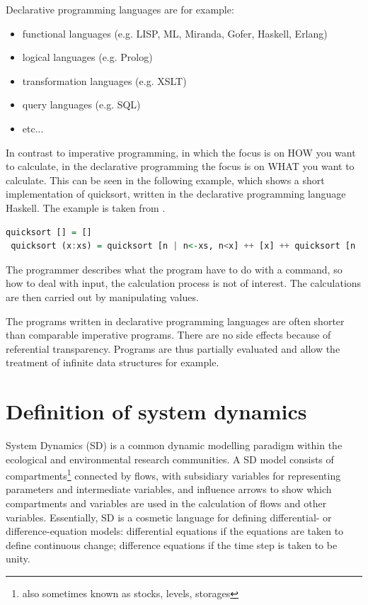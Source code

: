 \par
Declarative programming languages are for example:
\begin{itemize}
	\item functional languages (e.g. LISP, ML, Miranda, Gofer, Haskell, Erlang)
	\item logical languages (e.g. Prolog)
	\item transformation languages (e.g. XSLT)
	\item query languages (e.g. SQL)
	\item etc...
\end{itemize}

\par
In contrast to imperative programming, in which the focus is on HOW you want to calculate, in the declarative programming the focus is on WHAT you want to calculate. This can be seen in the following example, which shows a short implementation of quicksort, written in the declarative programming language Haskell. The example is taken from \autocite{appendix:declarative_programming}.
\begin{lstlisting}[language=Haskell]
 quicksort [] = []
 quicksort (x:xs) = quicksort [n | n<-xs, n<x] ++ [x] ++ quicksort [n | n<-xs, n>=x]
\end{lstlisting}
The programmer describes what the program have to do with a command, so how to deal with input, the calculation process is not of interest. The calculations are then carried out by manipulating values.
\par
The programs written in declarative programming languages are often shorter than comparable imperative programs. There are no side effects because of referential transparency. Programs are thus partially evaluated and allow the treatment of infinite data structures for example. \autocite{appendix:hawkins}

\section{Definition of system dynamics}
\par
System Dynamics (SD) is a common dynamic modelling paradigm within the ecological and environmental research communities. A SD model consists of compartments\footnote{also sometimes known as stocks, levels, storages}  connected by flows, with subsidiary variables for representing parameters and intermediate variables, and influence arrows to show which compartments and variables are used in the calculation of flows and other variables. Essentially, SD is a cosmetic language for defining differential- or difference-equation models: differential equations if the equations are taken to define continuous change; difference equations if the time step is taken to be unity. \autocite{appendix:model_paradigm}

